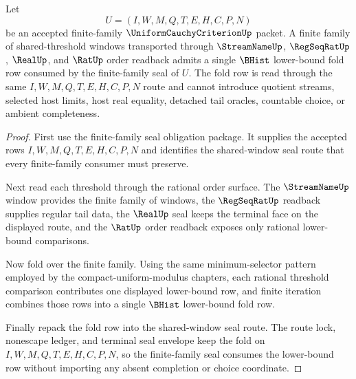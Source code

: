 \begin{theorem}
\label{thm:uniform-cauchy-criterion-finite-family-rat-fold-handoff}
Let
$$
U=(I,W,M,Q,T,E,H,C,P,N)
$$
be an accepted finite-family $\UniformCauchyCriterionUp$ packet. A finite family of shared-threshold windows transported through $\StreamNameUp$, $\RegSeqRatUp$, $\RealUp$, and $\RatUp$ order readback admits a single $\BHist$ lower-bound fold row consumed by the finite-family seal of $U$. The fold row is read through the same $I,W,M,Q,T,E,H,C,P,N$ route and cannot introduce quotient streams, selected host limits, host real equality, detached tail oracles, countable choice, or ambient completeness.
\end{theorem}
\begin{proof}
First use the finite-family seal obligation package. It supplies the accepted rows $I,W,M,Q,T,E,H,C,P,N$ and identifies the shared-window seal route that every finite-family consumer must preserve.

Next read each threshold through the rational order surface. The $\StreamNameUp$ window provides the finite family of windows, the $\RegSeqRatUp$ readback supplies regular tail data, the $\RealUp$ seal keeps the terminal face on the displayed route, and the $\RatUp$ order readback exposes only rational lower-bound comparisons.

Now fold over the finite family. Using the same minimum-selector pattern employed by the compact-uniform-modulus chapters, each rational threshold comparison contributes one displayed lower-bound row, and finite iteration combines those rows into a single $\BHist$ lower-bound fold row.

Finally repack the fold row into the shared-window seal route. The route lock, nonescape ledger, and terminal seal envelope keep the fold on $I,W,M,Q,T,E,H,C,P,N$, so the finite-family seal consumes the lower-bound row without importing any absent completion or choice coordinate.
\end{proof}
